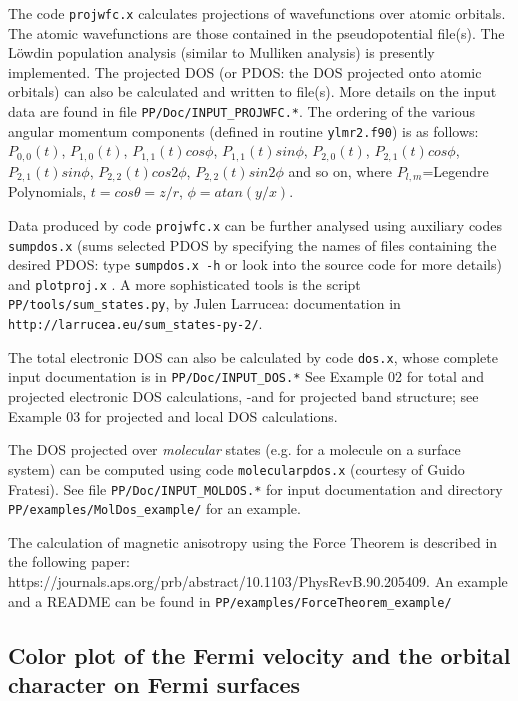 \documentclass[12pt,a4paper]{article}
\begin{document}
The code \texttt{projwfc.x} calculates projections of wavefunctions
over atomic orbitals. The atomic wavefunctions are those contained
in the pseudopotential file(s). The L\"owdin population analysis (similar to
Mulliken analysis) is presently implemented. The projected DOS (or PDOS:
the DOS projected onto atomic orbitals) can also be calculated and written
to file(s). More details on the input data are found in file
\texttt{PP/Doc/INPUT\_PROJWFC.*}. The ordering of the various 
angular momentum components (defined in routine \texttt{ylmr2.f90})
is as follows:
$P_{0,0}(t)$, $P_{1,0}(t)$, $P_{1,1}(t)cos\phi$, $P_{1,1}(t)sin\phi$,
 $P_{2,0}(t)$, $P_{2,1}(t)cos\phi$, $P_{2,1}(t)sin\phi$, 
 $P_{2,2}(t)cos2\phi$, $P_{2,2}(t)sin2\phi$
and so on, where $P_{l,m}$=Legendre Polynomials, 
$t = cos\theta = z/r$, $\phi= atan(y /x)$.

Data produced by code \texttt{projwfc.x} can be further 
analysed using auxiliary codes \texttt{sumpdos.x} (sums selected PDOS
by specifying the names of files containing the desired PDOS: type 
\texttt{sumpdos.x -h} or look into the source code for more details) 
and \texttt{plotproj.x} . A more sophisticated tools is the script
\texttt{PP/tools/sum\_states.py}, by Julen Larrucea: documentation in
\texttt{http://larrucea.eu/sum\_states-py-2/}.

The total electronic DOS can also be calculated by code \texttt{dos.x},
whose complete input documentation is in \texttt{PP/Doc/INPUT\_DOS.*}
See Example 02 for total and projected electronic DOS calculations,
-and for projected band structure;
see Example 03 for projected and local DOS calculations.

The DOS projected over {\em molecular} states (e.g. for a molecule on
a surface system) can be computed using code \texttt{molecularpdos.x}
(courtesy of Guido Fratesi). See file \texttt{PP/Doc/INPUT\_MOLDOS.*}
for input documentation and directory \texttt{PP/examples/MolDos\_example/} for
an example.

The calculation of magnetic anisotropy using the Force Theorem is described
in the following paper:
https://journals.aps.org/prb/abstract/10.1103/PhysRevB.90.205409. An
example and a README can be found in \texttt{PP/examples/ForceTheorem\_example/}

\subsection{Color plot of the Fermi velocity and the orbital character
  on Fermi surfaces}
\end{document}
